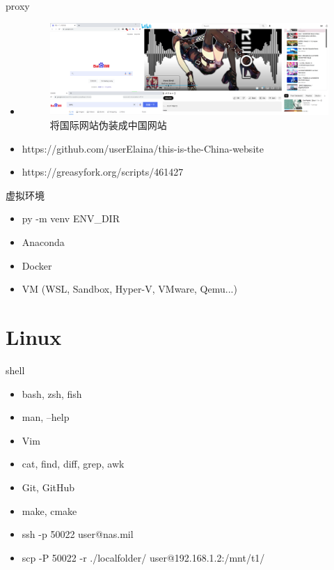 \documentclass{beamer}
\begin{document}
\begin{frame}{proxy}
    \begin{itemize}
        \item \begin{figure}[c]
            \centering
            \includegraphics[height=.5\textheight]{pic/gf.png}
            \caption{将国际网站伪装成中国网站}
        \end{figure}
        \item https://github.com/userElaina/this-is-the-China-website
        \item https://greasyfork.org/scripts/461427
    \end{itemize}
\end{frame}

\begin{frame}{虚拟环境}
    \begin{itemize}
        \item py -m venv ENV\_DIR
        \item Anaconda
        \item Docker
        \item VM (WSL, Sandbox, Hyper-V, VMware, Qemu...)
    \end{itemize}
\end{frame}

\section{Linux}

\begin{frame}{shell}
    \begin{itemize}
        \item bash, zsh, fish
        \item man, --help
        \item Vim
        \item cat, find, diff, grep, awk
        \item Git, GitHub
        \item make, cmake
        \item ssh -p 50022 user@nas.mil
        \item scp -P 50022 -r ./localfolder/ user@192.168.1.2:/mnt/t1/
    \end{itemize}
\end{frame}
\end{document}
